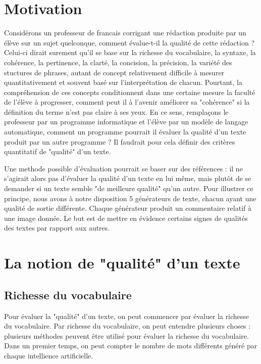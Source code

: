 \documentclass[11pt]{article}
\begin{document}

\section {Motivation}

Considérons un professeur de francais corrigant une rédaction produite par un élève sur un sujet quelconque, comment évalue-t-il la qualité de cette rédaction ? 
Celui-ci dirait surement qu'il se base sur la richesse du vocabulaire, la syntaxe, la cohérence, la pertinence, la clarté, la concision, la précision, la variété des stuctures de phrases, autant de concept relativement 
difficile à mesurer quantitativement et souvent basé sur l'interprétation de chacun. 
Pourtant, la compréhension de ces concepts conditionnent dans une certaine mesure la faculté de l'élève à progresser, comment peut il à l'avenir améliorer sa "cohérence" si la définition du terme n'est pas claire à ses yeux.
En ce sens, remplaçons le professeur par un programme informatique et l'élève par un modèle de langage automatique, comment un programme pourrait il évaluer la qualité d'un texte produit par un autre programme ?
Il faudrait pour cela définir des critères quantitatif de "qualité" d'un texte. 

Une methode possible d'évaluation pourrait se baser sur des références : il ne s'agirait alors pas d'évaluer la qualité d'un texte en lui même, mais plutôt de se demander si un texte semble "de meilleure qualité" qu'un autre.
Pour illustrer ce principe, nous avons à notre disposition 5 générateurs de texte, chacun ayant une qualité de sortie différente. Chaque générateur produit un commentaire relatif à une image donnée.
Le but est de mettre en évidence certains signes de qualités des textes par rapport aux autres.

\section {La notion de "qualité" d'un texte}

\subsection {Richesse du vocabulaire}

Pour évaluer la "qualité" d'un texte, on peut commencer par évaluer la richesse du vocabulaire. 
Par richesse du vocabulaire, on peut entendre plusieurs choses : plusieurs méthodes peuvent être utilisé pour évaluer la richesse du vocabulaire. 
Dans un premier temps, on peut compter le nombre de mots différents généré par chaque intellience artificielle. 
\end{document}
